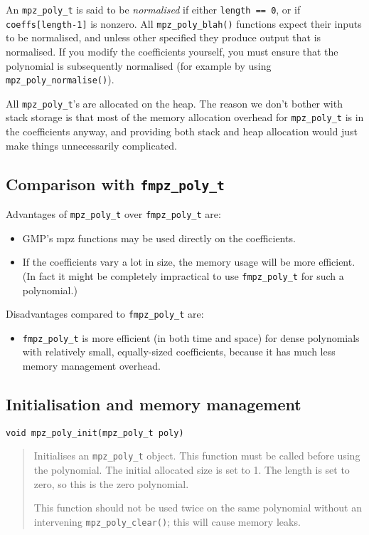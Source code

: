 \documentclass[a4paper,10pt]{article}
\newcommand{\code}{\lstinline}
\begin{document}
An \code{mpz_poly_t} is said to be \emph{normalised} if either \code{length == 0}, or if \code{coeffs[length-1]} is nonzero. All \code{mpz_poly_blah()} functions expect their inputs to be normalised, and unless other specified they produce output that is normalised. If you modify the coefficients yourself, you must ensure that the polynomial is subsequently normalised (for example by using \code{mpz_poly_normalise()}).

All \code{mpz_poly_t}'s are allocated on the heap. The reason we don't bother with stack storage is that most of the memory allocation overhead for \code{mpz_poly_t} is in the coefficients anyway, and providing both stack and heap allocation would just make things unnecessarily complicated.


\subsection{Comparison with \code{fmpz_poly_t}}

Advantages of \code{mpz_poly_t} over \code{fmpz_poly_t} are:
\begin{itemize}
\item GMP's mpz functions may be used directly on the coefficients.
\item If the coefficients vary a lot in size, the memory usage will be more efficient. (In fact it might be completely impractical to use \code{fmpz_poly_t} for such a polynomial.)
\end{itemize}

Disadvantages compared to \code{fmpz_poly_t} are:
\begin{itemize}
\item \code{fmpz_poly_t} is more efficient (in both time and space) for dense polynomials with relatively small, equally-sized coefficients, because it has much less memory management overhead.
\end{itemize}


\subsection{Initialisation and memory management}

\begin{lstlisting}
void mpz_poly_init(mpz_poly_t poly)
\end{lstlisting}
\begin{quote}
Initialises an \code{mpz_poly_t} object. This function must be called before using the polynomial. The initial allocated size is set to 1. The length is set to zero, so this is the zero polynomial. 

This function should not be used twice on the same polynomial without an intervening \code{mpz_poly_clear()}; this will cause memory leaks.
\end{quote}
\end{document}
